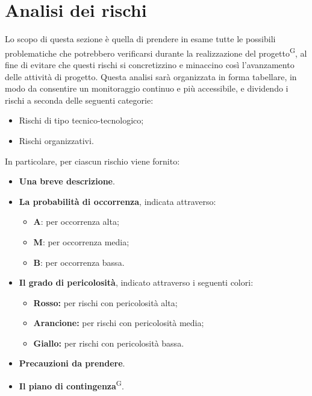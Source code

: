 \section{Analisi dei rischi}\label{sec:analisi_rischi}
Lo scopo di questa sezione è quella di prendere in esame tutte le possibili problematiche che potrebbero verificarsi durante la realizzazione del progetto\textsuperscript{G}, al fine di evitare che questi rischi si concretizzino e minaccino così l'avanzamento delle attività di progetto.
Questa analisi sarà organizzata in forma tabellare, in modo da consentire un monitoraggio continuo e più accessibile, e dividendo i rischi a seconda delle seguenti categorie:
\begin{itemize}
    \item Rischi di tipo tecnico-tecnologico;
    \item Rischi organizzativi.
\end{itemize}
In particolare, per ciascun rischio viene fornito:
\begin{itemize}
    \item \textbf{Una breve descrizione}.
    \item \textbf{La probabilità di occorrenza}, indicata attraverso:
        \begin{itemize}
            \item \textbf{A}: per occorrenza alta;
            \item \textbf{M}: per occorrenza media;
            \item \textbf{B}: per occorrenza bassa.
        \end{itemize}
    \item \textbf{Il grado di pericolosità}, indicato attraverso i seguenti colori:
        \begin{itemize}
        \item \colorbox{red!50}{\textbf{Rosso:}} per rischi con pericolosità alta;
        \item \colorbox{orange!50}{\textbf{Arancione:}} per rischi con pericolosità media;
        \item \colorbox{yellow!75}{\textbf{Giallo:}} per rischi con pericolosità bassa.
        \end{itemize}
    \item \textbf{Precauzioni da prendere}.
    \item \textbf{Il piano di contingenza}\textsuperscript{G}.
\end{itemize}

